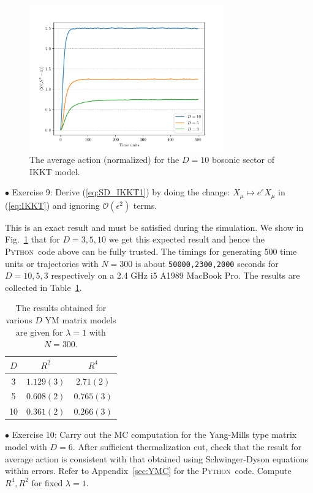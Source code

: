 \documentclass[letter,11pt]{article}
\newcommand{\PY}{\textsc{Python}}
\begin{document}
\begin{figure}[htbp] 
	\centering 
	\includegraphics[width=0.75\textwidth]{figs/act_allD_YM.pdf}
	\caption{\label{fig:IKKT_2}The average action (normalized) for the $D=10$ bosonic sector of IKKT model.}
\end{figure}

\begin{mdframed}[backgroundcolor=blue!3] 
	$\bullet$ Exercise 9: Derive (\ref{eq:SD_IKKT1}) by doing the change: $X_{\mu} \mapsto e^{\epsilon}X_{\mu}$ in (\ref{eq:IKKT}) and ignoring 
	$\mathcal{O}(\epsilon^{2})$ terms.
\end{mdframed}
This is an exact result and must be satisfied during the simulation. We show in Fig.~\ref{fig:IKKT_2} that for $D=3,5,10$ we get this expected result and hence the \PY~code above can be fully trusted. The timings for generating 500 time units or trajectories 
with $N=300$ is about \texttt{50000,2300,2000} seconds for $D = 10, 5, 3$ respectively on 
a 2.4 GHz i5 A1989 MacBook Pro. The results are collected in Table~\ref{table:D_IKKT_data}. 
\begin{table}[h!]
	\centering
	\begin{tabular}{||c c c||} 
		\hline
		$D$ & $R^2$ & $R^4$ \\ [0.5ex] 
		\hline\hline
		3 & $1.129(3) $ & $2.71(2) $  \\ 
		5 & $0.608(2) $ & $0.765(3) $  \\
		10 & $0.361(2)$ & $0.266(3)$
		 \\ [1ex] 
		\hline 
	\end{tabular}
\caption{The results obtained for various $D$ YM matrix models are given for $\lambda=1$ with $N=300$.}
\label{table:D_IKKT_data}
\end{table}
\begin{mdframed}[backgroundcolor=blue!3] 
	$\bullet$ Exercise 10: Carry out the MC computation for the Yang-Mills type matrix model with $D=6$. After sufficient thermalization cut, check that the result for average action is consistent with that obtained using Schwinger-Dyson equations within errors. Refer to Appendix~\ref{sec:YMC} for the \PY~code. Compute $R^4, R^2$ for fixed $\lambda=1$. 
\end{mdframed} 
\end{document}
